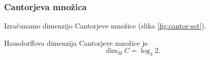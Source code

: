 



\subsubsection{Cantorjeva množica}
Izračunamo dimenzijo Cantorjeve množice (slika \ref{fig:cantor-set}).

\begin{trditev}
    Hausdorffova dimenzija Cantorjeve množice je
    \[\dim_H C = \log_3 2.\]
\end{trditev}

